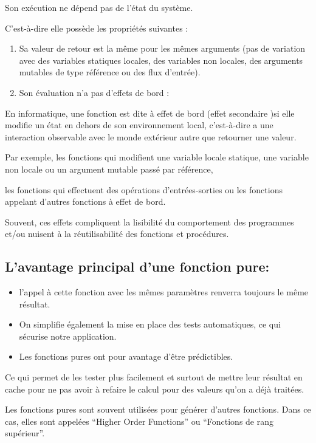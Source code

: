 \documentclass[12pt,titlepage]{article}
\begin{document}
Son exécution ne dépend pas de l’état du système.

C'est-à-dire elle possède  les propriétés suivantes :

\begin{enumerate}
	\item Sa valeur de retour est la même pour les mêmes arguments (pas de variation avec des variables statiques locales, des variables non locales, des arguments mutables de type référence ou des flux d'entrée).

	\item Son évaluation n'a pas d'effets de bord :
\end{enumerate}


En informatique, une fonction est dite à effet de bord (effet secondaire )si elle modifie un état en dehors de son environnement local, c'est-à-dire a une interaction observable avec le monde extérieur autre que retourner une valeur.

Par exemple, les fonctions qui modifient une variable locale statique, une variable non locale ou un argument mutable passé par référence,

les fonctions qui effectuent des opérations d'entrées-sorties ou les fonctions appelant d'autres fonctions à effet de bord.

Souvent, ces effets compliquent la lisibilité du comportement des programmes et/ou nuisent à la réutilisabilité des fonctions et procédures.

\subsection{L’avantage principal d'une fonction pure:}

\begin{itemize}
	\item l'appel à cette fonction avec les mêmes paramètres renverra toujours le même résultat.
	\item On simplifie également la mise en place des tests automatiques, ce qui sécurise notre application.
	\item Les fonctions pures ont pour avantage d’être prédictibles.
\end{itemize}

Ce qui permet de les tester plus facilement et surtout de mettre leur résultat en cache pour ne pas avoir à refaire le calcul pour des valeurs qu’on a déjà traitées.

Les fonctions pures sont souvent utilisées pour générer d’autres fonctions. Dans ce cas, elles sont appelées “Higher Order Functions” ou “Fonctions de rang supérieur”.
\end{document}
